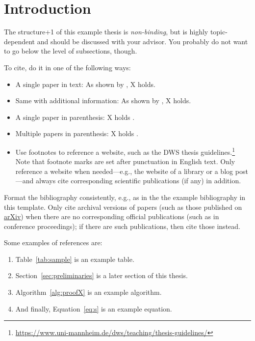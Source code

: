 \documentclass[a4paper,oneside,bibliography=totoc]{scrbook}
\begin{document}
\begingroup%
\hypersetup{hidelinks}%
\tableofcontents%
\endgroup



\mainmatter

\chapter{Introduction}
\label{ch:intro}

The structure+1 of this example thesis is \emph{non-binding}, but is highly
topic-dependent and should be discussed with your advisor. You probably do not
want to go below the level of subsections, though.

To cite, do it in one of the following ways:
\begin{itemize}
\item A single paper in text: As shown by \citet{doe2024proof}, X holds.
\item Same with additional information: As shown by \citet[p. 20]{doe2024proof},
  X holds.
\item A single paper in parenthesis: X holds \cite{doe2024proof}.
\item Multiple papers in parenthesis: X holds
  \cite{brown2022techreport,smith2023conference,lee2023journal,doe2024proof}.
\item Use footnotes to reference a website, such as the DWS thesis
  guidelines.\footnote{\url{https://www.uni-mannheim.de/dws/teaching/thesis-guidelines/}}
  Note that footnote marks are set after punctuation in English text. Only
  reference a website when needed---e.g., the website of a library or a blog
  post---and always cite corresponding scientific publications (if any) in
  addition.
\end{itemize}
Format the bibliography consistently, e.g., as in the the example bibliography
in this template. Only cite archival versions of papers (such as those published
on \href{https://arxiv.org}{arXiv}) when there are no corresponding official
publications (such as in conference proceedings); if there are such
publications, then cite those instead.


Some examples of references are:
\begin{enumerate}
\item Table~\ref{tab:sample} is an example table.
\item Section~\ref{sec:preliminaries} is a later section of this thesis.
\item Algorithm~\ref{alg:proofX} is an example algorithm.
\item And finally, Equation~\eqref{eq:s} is an example equation.
\end{enumerate}
\end{document}
